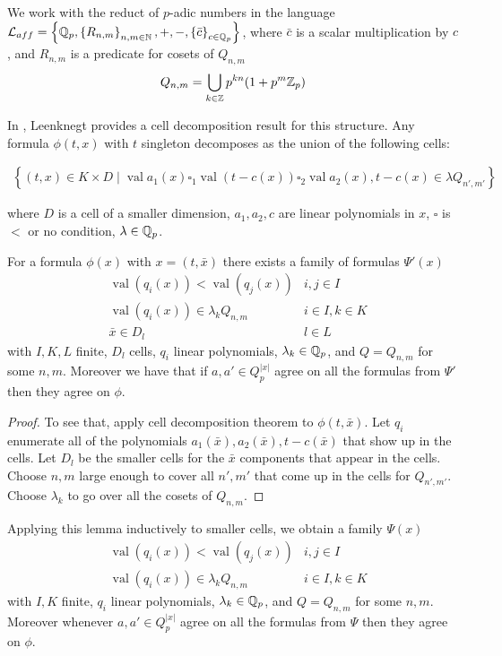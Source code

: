 \documentclass{amsart}
\renewcommand{\LL}{\mathcal L_{aff}}
\newcommand{\curly}[1]{\left\{#1\right\}}
\newcommand{\paren}[1]{\left(#1\right)}
\DeclareMathOperator{\val}{val}
\begin{document}
We work with the reduct of $p$-adic numbers in the language $\LL = \curly{\Q_p, \curly{R_{n,m}}_{n,m\in \N}, +, -, \curly{\bar c}_{c \in \Q_p} }$,
where $\bar c$ is a scalar multiplication by $c$, and $R_{n,m}$ is a predicate for cosets of $Q_{n,m}$
\begin{align*}
    Q_{n,m} = \bigcup_{k \in \mathbb{Z}} p^{kn} (1 + p^m\mathbb{Z}_p) 
\end{align*}


In \cite{reduct}, Leenknegt provides a cell decomposition result for this structure.
Any formula $\phi(t, x)$  with $t$  singleton decomposes as the union of the following cells:

\begin{align*}
	\curly{(t, x) \in K \times D \mid \val a_1(x) \square_1 \val (t - c(x)) \square_2 \val a_2(x), t - c(x) \in \lambda Q_{n',m'} }
\end{align*}

where $D$ is a cell of a smaller dimension, $a_1, a_2, c$ are linear polynomials in  $x$, $\square$ is $<$ or no condition, $\lambda  \in\mathbb{Q}_p$.

\begin{Lemma}
	For a formula $\phi(x)$ with $x = (t, \bar x)$ there exists a family of formulas $\Psi'(x)$
	\begin{align*}
		&\val \paren{q_i(x)} < \val \paren{q_j(x)} & i, j \in I \\
		&\val \paren{q_i(x)} \in \lambda_k Q_{n,m} & i \in I , k \in K \\
		&\bar x \in D_l & l \in L
	\end{align*}
	with $I, K, L$ finite,
	$D_l$ cells,
	$q_i$ linear polynomials,
	$\lambda_k \in \mathbb{Q}_p$, and
	$Q = Q_{n,m}$ for some $n,m$.
	Moreover we have that if $a, a' \in Q_p^{|x|}$ agree on all the formulas from $\Psi'$ then they agree on $\phi$.
\end{Lemma}

\begin{proof}
	To see that, apply cell decomposition theorem to $\phi(t, \bar x)$.
	Let $q_i$ enumerate all of the polynomials $a_1(\bar x), a_2(\bar x), t - c(\bar x)$ that show up in the cells.
	Let $D_l$ be the smaller cells for the $\bar x$ components that appear in the cells.
	Choose $n,m$ large enough to cover all $n', m'$ that come up in the cells for $Q_{n',m'}$.
	Choose $\lambda_k$ to go over all the cosets of $Q_{n,m}$.
\end{proof}

Applying this lemma inductively to smaller cells, we obtain a family $\Psi(x)$
\begin{align*}
		&\val \paren{q_i(x)} < \val \paren{q_j(x)} & i, j \in I \\
		&\val \paren{q_i(x)} \in \lambda_k Q_{n,m} & i \in I , k \in K
\end{align*}
with $I, K$ finite,
$q_i$ linear polynomials,
$\lambda_k \in \mathbb{Q}_p$, and
$Q = Q_{n,m}$ for some $n,m$.
Moreover whenever $a, a' \in Q_p^{|x|}$ agree on all the formulas from $\Psi$ then they agree on $\phi$.
\end{document}
